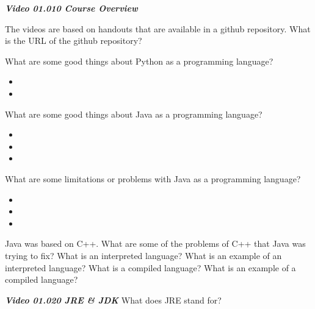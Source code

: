 \documentclass[letterpaper,11pt]{exam}
\begin{document}
%
%

\textit{\textbf{Video 01.010 Course Overview}}

\begin{questions}

\question The videos are based on handouts that are available in a github repository.  What is the URL of the github repository?
\vspace{.5cm}

\question What are some good things about Python as a programming language?
\begin{itemize}
        \item
        \item 
\end{itemize}
\question What are some good things about Java as a programming language?
\begin{itemize}
        \item
        \item 
        \item 
\end{itemize}

\begin{samepage}
\question What are some limitations or problems with Java as a programming language?
\begin{itemize}
    \item
    \item 
    \item 
\end{itemize}
\end{samepage}

\question Java was based on C++.  What are some of the problems of C++ that Java was trying to fix?
\vspace{1cm}
\question What is an interpreted language?  What is an example of an interpreted language?
\vspace{1cm}
\question What is a compiled language?  What is an example of a compiled language?
\vspace{.5cm}

\textit{\textbf{Video 01.020 JRE \& JDK}}
\question What does JRE stand for?


\end{questions}
\end{document}
